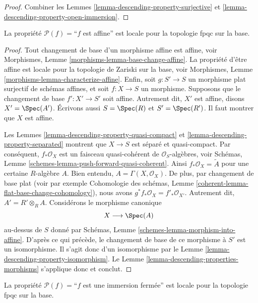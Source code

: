 \begin{proof}
Combiner les Lemmes \ref{lemma-descending-property-surjective}
et \ref{lemma-descending-property-open-immersion}.
\end{proof}

\begin{lemma}
\label{lemma-descending-property-affine}
La propriété $\mathcal{P}(f) =$``$f$ est affine''
est locale pour la topologie fpqc sur la base.
\end{lemma}

\begin{proof}
Tout changement de base d'un morphisme affine est affine, voir
Morphismes, Lemme \ref{morphisms-lemma-base-change-affine}.
La propriété d'être affine est locale pour la topologie de Zariski sur la base,
voir Morphismes, Lemme \ref{morphisms-lemma-characterize-affine}.
Enfin, soit
$g : S' \to S$ un morphisme plat surjectif de schémas affines,
et soit $f : X \to S$ un morphisme. Supposons que le changement de base
$f' : X' \to S'$ soit affine. Autrement dit, $X'$ est affine, disons
$X' = \Spec(A')$. Écrivons aussi $S = \Spec(R)$
et $S' = \Spec(R')$. Il faut montrer que $X$ est affine.

\medskip\noindent
Les Lemmes \ref{lemma-descending-property-quasi-compact}
et \ref{lemma-descending-property-separated} montrent que
$X \to S$ est séparé et quasi-compact. Par conséquent,
$f_*\mathcal{O}_X$ est un faisceau quasi-cohérent de $\mathcal{O}_S$-algèbres,
voir Schémas, Lemme \ref{schemes-lemma-push-forward-quasi-coherent}.
Ainsi $f_*\mathcal{O}_X = \widetilde{A}$ pour une certaine $R$-algèbre $A$.
Bien entendu, $A = \Gamma(X, \mathcal{O}_X)$.
De plus, par changement de base plat
(voir par exemple Cohomologie des schémas,
Lemme \ref{coherent-lemma-flat-base-change-cohomology}),
nous avons $g^*f_*\mathcal{O}_X = f'_*\mathcal{O}_{X'}$.
Autrement dit, $A' = R' \otimes_R A$.
Considérons le morphisme canonique
$$
X \longrightarrow \Spec(A)
$$
au-dessus de $S$ donné par Schémas,
Lemme \ref{schemes-lemma-morphism-into-affine}.
D'après ce qui précède, le changement de base de ce morphisme à $S'$ est un
isomorphisme. Il s'agit donc d'un isomorphisme par le
Lemme \ref{lemma-descending-property-isomorphism}.
Le Lemme \ref{lemma-descending-properties-morphisms} s'applique donc et conclut.
\end{proof}

\begin{lemma}
\label{lemma-descending-property-closed-immersion}
La propriété $\mathcal{P}(f) =$``$f$ est une immersion fermée''
est locale pour la topologie fpqc sur la base.
\end{lemma}

